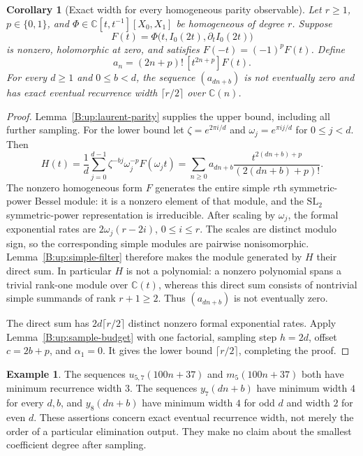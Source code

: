 \documentclass[11pt,a4paper]{article}
\newtheorem{corollary}[theorem]{Corollary}
\theoremstyle{definition}
\newtheorem{example}[theorem]{Example}
\theoremstyle{remark}
\newcommand{\C}{\mathbb C}
\numberwithin{equation}{section}
\begin{document}
\begin{corollary}[Exact width for every homogeneous parity observable]
\label{B:up:general-parity-width}
Let $r\ge1$, $p\in\{0,1\}$, and
$\Phi\in\C[t,t^{-1}][X_0,X_1]$ be homogeneous of degree $r$.
Suppose
\[
 F(t)=\Phi\bigl(t,I_0(2t),\partial_t I_0(2t)\bigr)
\]
is nonzero, holomorphic at zero, and satisfies
$F(-t)=(-1)^pF(t)$.  Define
\[
 a_n=(2n+p)!\,[t^{2n+p}]F(t).
\]
For every $d\ge1$ and $0\le b<d$, the sequence $(a_{dn+b})$
is not eventually zero and has exact eventual recurrence width
$\lceil r/2\rceil$ over $\C(n)$.
\end{corollary}
\begin{proof}
Lemma~\ref{B:up:laurent-parity} supplies the upper bound, including
all further sampling.  For the lower bound let
$\zeta=e^{2\pi i/d}$ and $\omega_j=e^{\pi i j/d}$ for $0\le j<d$.
Then
\[
 H(t)=\frac1d\sum_{j=0}^{d-1}\zeta^{-bj}\omega_j^{-p}F(\omega_jt)
 =\sum_{n\ge0}a_{dn+b}\frac{t^{2(dn+b)+p}}{(2(dn+b)+p)!}.
\]
The nonzero homogeneous form $F$ generates the entire simple
$r$th symmetric-power Bessel module: it is a nonzero element of
that module, and the $\mathrm{SL}_2$ symmetric-power representation
is irreducible.  After scaling by $\omega_j$, the formal
exponential rates are $2\omega_j(r-2i)$, $0\le i\le r$.
The scales are distinct modulo sign, so the corresponding simple
modules are pairwise nonisomorphic.  Lemma~\ref{B:up:simple-filter}
therefore makes the module generated by $H$ their direct sum.
In particular $H$ is not a polynomial: a nonzero polynomial
spans a trivial rank-one module over $\C(t)$, whereas this direct
sum consists of nontrivial simple summands of rank $r+1\ge2$.
Thus $(a_{dn+b})$ is not eventually zero.

The direct sum has $2d\lceil r/2\rceil$ distinct nonzero formal
exponential rates.  Apply Lemma~\ref{B:up:sample-budget} with one
factorial, sampling step $h=2d$, offset $c=2b+p$, and
$\alpha_1=0$.  It gives the lower bound
$\lceil r/2\rceil$, completing the proof.
\end{proof}

\begin{example}
The sequences $u_{5,7}(100n+37)$ and $m_5(100n+37)$ both have
minimum recurrence width $3$.  The sequences $y_7(dn+b)$ have
minimum width $4$ for every $d,b$, and $y_8(dn+b)$ have minimum
width $4$ for odd $d$ and width $2$ for even $d$.  These assertions concern exact
eventual recurrence width, not merely the order of a particular
elimination output.  They make no claim about the smallest
coefficient degree after sampling.
\end{example}
\end{document}
